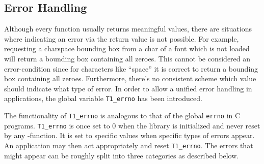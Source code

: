 \subsection{Error Handling}
\label{errorhandling}
Although every function usually returns meaningful values, there are
situations where indicating an error via the return value is not possible. For
example, requesting a charspace bounding box from a char of a font which is not
loaded will return a bounding box containing all zeroes. This cannot be
considered an error-condition since for characters like ``space'' it is
correct to return a bounding box containing all zeroes. Furthermore, there's no
consistent scheme which value should indicate what type of error. In order to
allow a unified error handling in applications, the global variable
\verb+T1_errno+ has been introduced. 

The functionality of \verb+T1_errno+ is analogous to that of the global
\verb+errno+ in C programs. \verb+T1_errno+ is once set to 0 when the library
is initialized and never reset by any \tonelib-function. It is set to specific
values when specific types of errors appear. An application may then act
appropriately and reset \verb+T1_errno+.
The errors that might appear can be roughly split into three categories as
described below.

